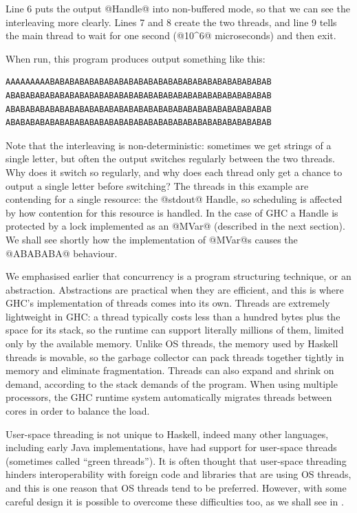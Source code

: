 \noindent Line 6 puts the output @Handle@ into non-buffered mode, so
that we can see the interleaving more clearly.  Lines 7 and 8 create
the two threads, and line 9 tells the main thread to wait for one
second (@10^6@ microseconds) and then exit.

When run, this program produces output something like this:

\begin{verbatim}
AAAAAAAAABABABABABABABABABABABABABABABABABABABABABABAB
ABABABABABABABABABABABABABABABABABABABABABABABABABABAB
ABABABABABABABABABABABABABABABABABABABABABABABABABABAB
ABABABABABABABABABABABABABABABABABABABABABABABABABABAB
\end{verbatim}

\noindent Note that the interleaving is non-deterministic: sometimes we get
strings of a single letter, but often the output switches regularly
between the two threads.  Why does it switch so regularly, and why
does each thread only get a chance to output a single letter before
switching?  The threads in this example are contending for a single
resource: the @stdout@ Handle, so scheduling is affected by how
contention for this resource is handled.  In the case of GHC a Handle
is protected by a lock implemented as an @MVar@ (described in the next
section).  We shall see shortly how the implementation of @MVar@s
causes the @ABABABA@ behaviour.

We emphasised earlier that concurrency is a program structuring
technique, or an abstraction.  Abstractions are practical when they
are efficient, and this is where GHC's implementation of threads comes
into its own.  Threads are extremely lightweight in GHC: a thread
typically costs less than a hundred bytes plus the space for its
stack, so the runtime can support literally millions of them, limited
only by the available memory.  Unlike OS threads, the memory used by
Haskell threads is movable, so the garbage collector can pack threads
together tightly in memory and eliminate fragmentation.  Threads can
also expand and shrink on demand, according to the stack demands of
the program.  When using multiple processors, the GHC runtime system
automatically migrates threads between cores in order to balance the
load.

User-space threading is not unique to Haskell, indeed many other
languages, including early Java implementations, have had support for
user-space threads (sometimes called ``green threads'').  It is often
thought that user-space threading hinders interoperability with
foreign code and libraries that are using OS threads, and this is one
reason that OS threads tend to be preferred.  However, with some
careful design it is possible to overcome these difficulties too, as
we shall see in .

